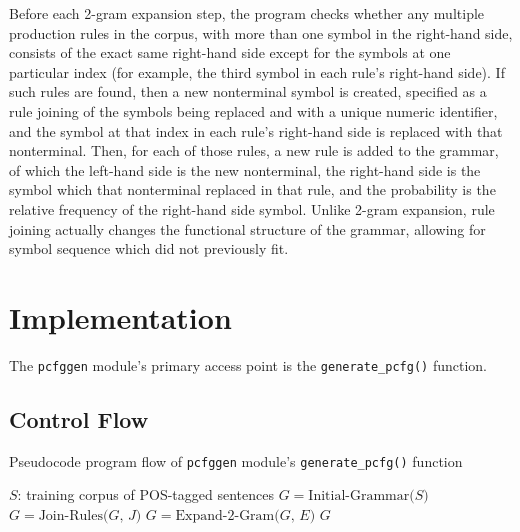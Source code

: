 \documentclass[paper=a4, fontsize=11pt]{scrartcl} %
\numberwithin{equation}{section} %
\numberwithin{figure}{section} %
\numberwithin{table}{section} %
\begin{document}
Before each 2-gram expansion step, the program checks whether any multiple production rules in the corpus, with more than one symbol in the right-hand side, consists of the exact same right-hand side except for the symbols at one particular index (for example, the third symbol in each rule's right-hand side). If such rules are found, then a new nonterminal symbol is created, specified as a rule joining of the symbols being replaced and with a unique numeric identifier, and the symbol at that index in each rule's right-hand side is replaced with that nonterminal. Then, for each of those rules, a new rule is added to the grammar, of which the left-hand side is the new nonterminal, the right-hand side is the symbol which that nonterminal replaced in that rule, and the probability is the relative frequency of the right-hand side symbol. Unlike 2-gram expansion, rule joining actually changes the functional structure of the grammar, allowing for symbol sequence which did not previously fit.


\section{Implementation}

The \texttt{pcfggen} module's primary access point is the \texttt{generate\_pcfg()} function.

\subsection{Control Flow}

\begin{algorithm}
\caption{Pseudocode program flow of \texttt{pcfggen} module's \texttt{generate\_pcfg()} function}
\begin{algorithmic}
 \Comment $S$: training corpus of POS-tagged sentences
\State $G = \text{Initial-Grammar($S$)}$
\Loop
{}
\State $G = \text{Join-Rules($G$, $J$)}$
\EndWhile
{}
\State $G = \text{Expand-2-Gram($G$, $E$)}$
\Else
\State \Return $G$
\EndIf
\EndLoop
\EndFunction
\end{algorithmic}
\end{algorithm}
\end{document}
